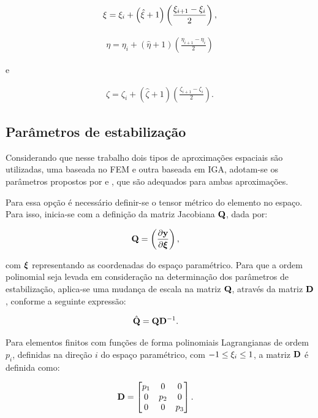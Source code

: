 \documentclass[tese_patricia]{subfiles}
\begin{document}
\begin{align}
\xi = \xi_{i} + \left(\hat{\xi}+1\right) \left(\frac{\xi_{i+1}-\xi_{i}}{2}\right),
\end{align}

\begin{align}
\eta = \eta_{i} + \left(\hat{\eta}+1\right) \left(\frac{\eta_{i+1}-\eta_{i}}{2}\right)
\end{align}

\noindent e

\begin{align}
\zeta = \zeta_{i} + \left(\hat{\zeta}+1\right) \left(\frac{\zeta_{i+1}-\zeta_{i}}{2}\right).
\end{align}

\subsection{Parâmetros de estabilização}\label{capitulo:Cap3:RepreGeo:taus2}

Considerando que nesse trabalho dois tipos de aproximações espaciais são utilizadas, uma baseada no FEM e outra baseada em IGA, adotam-se os parâmetros propostos por  e , que são adequados para ambas aproximações. 

Para essa opção é necessário definir-se o tensor métrico do elemento no espaço. Para isso, inicia-se com a definição da matriz Jacobiana $\mathbf{Q}$, dada por:

\begin{align}
	\mathbf{Q}&=\left(\frac{\partial\mathbf{y}}{\partial\bm{\xi}}\right),
\end{align}

\noindent com $\bm{\xi}$ representando as coordenadas do espaço paramétrico. Para que a ordem polinomial seja levada em consideração na determinação dos parâmetros de estabilização, aplica-se uma mudança de escala na matriz $\mathbf{Q}$, através da matriz $\mathbf{D}$, conforme a seguinte expressão:

\begin{align}
	\hat{\mathbf{Q}}&=\mathbf{Q}\mathbf{D}^{-1}.
\end{align}

Para elementos finitos com funções de forma polinomiais Lagrangianas de ordem $p_i$, definidas na direção $i$ do espaço paramétrico, com $-1\leq\xi_i\leq1$, a matriz $\mathbf{D}$ é definida como:

\begin{align}
	\mathbf{D}&=\begin{bmatrix}
		p_{1} & 0 & 0\\
		0 & p_{2} & 0 \\
		0 & 0 & p_{3}
	\end{bmatrix}.
\end{align}
\end{document}
